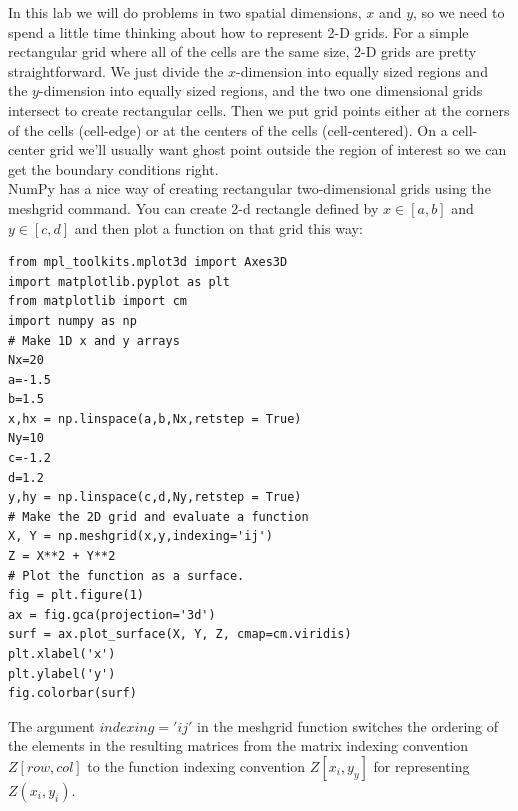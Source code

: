 \documentclass{book}
\theoremstyle{plain}
\theoremstyle{definition}
\numberwithin{exm}{chapter}
\theoremstyle{remark}
\theoremstyle{summary}
\theoremstyle{overview}
\begin{document}
In this lab we will do problems in two spatial dimensions, $x$ and $y$, so we need
to spend a little time thinking about how to represent 2-D grids. For a simple
rectangular grid where all of the cells are the same size, 2-D grids are pretty
straightforward. We just divide the $x$-dimension into equally sized regions and
the $y$-dimension into equally sized regions, and the two one dimensional grids
intersect to create rectangular cells. Then we put grid points either at the corners
of the cells (cell-edge) or at the centers of the cells (cell-centered). On a cell-center
grid we\rq ll usually want ghost point outside the region of interest so we can get the
boundary conditions right. \\ NumPy has a nice way of creating rectangular two-dimensional grids using
the meshgrid command. You can create 2-d rectangle defined by $x \in [a,b]$ and
$y \in [c,d]$ and then plot a function on that grid this way:
\begin{lstlisting}
from mpl_toolkits.mplot3d import Axes3D
import matplotlib.pyplot as plt
from matplotlib import cm
import numpy as np
# Make 1D x and y arrays
Nx=20
a=-1.5
b=1.5
x,hx = np.linspace(a,b,Nx,retstep = True)
Ny=10
c=-1.2
d=1.2
y,hy = np.linspace(c,d,Ny,retstep = True)
# Make the 2D grid and evaluate a function
X, Y = np.meshgrid(x,y,indexing='ij')
Z = X**2 + Y**2
# Plot the function as a surface.
fig = plt.figure(1)
ax = fig.gca(projection='3d')
surf = ax.plot_surface(X, Y, Z, cmap=cm.viridis)
plt.xlabel('x')
plt.ylabel('y')
fig.colorbar(surf)
\end{lstlisting}
The argument $indexing='ij'$ in the meshgrid function switches the ordering
of the elements in the resulting matrices from the matrix indexing convention
$Z[row,col]$ to the function indexing convention $Z[x_i,y_y]$ for representing $Z(x_i, y_i)$.
\end{document}
